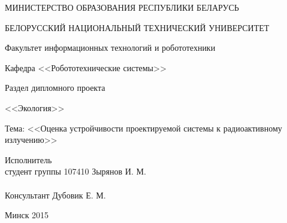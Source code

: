 \begin{titlepage} %

\thispagestyle{empty} %

\begin{center}
МИНИСТЕРСТВО ОБРАЗОВАНИЯ РЕСПУБЛИКИ БЕЛАРУСЬ

БЕЛОРУССКИЙ НАЦИОНАЛЬНЫЙ ТЕХНИЧЕСКИЙ УНИВЕРСИТЕТ

Факультет информационных технологий и робототехники

Кафедра <<Робототехнические системы>>
\end{center}

\vfill

\begin{center}
    \normalsize{Раздел дипломного проекта}

    \large{<<Экология>>}

    \normalsize{Тема: <<Оценка устройчивости проектируемой системы к радиоактивному излучению>>}
\end{center}

\vfill

\noindent
Исполнитель\\
студент группы 107410 \hfill Зырянов И. М.
\\
\\
\noindent
Консультант \hfill Дубовик Е. М.

\vfill

\centerline{Минск 2015}

\clearpage %

\end{titlepage}

\setcounter{page}{2}
